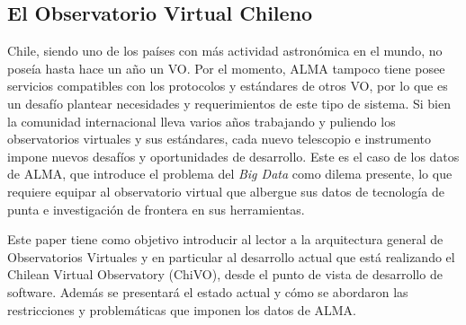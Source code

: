 \subsection{El Observatorio Virtual Chileno}
Chile, siendo uno de los países con más actividad astronómica en el mundo, no poseía hasta
hace un año un VO. Por el momento, ALMA tampoco tiene posee servicios
compatibles con los protocolos y estándares de otros VO, por lo que es un desafío
plantear necesidades y requerimientos de este tipo de sistema.
Si bien la comunidad internacional lleva varios años trabajando y puliendo
los observatorios virtuales y sus estándares, cada nuevo telescopio e
instrumento impone nuevos desafíos y oportunidades de desarrollo. 
Este es el caso de los datos de ALMA, que introduce el problema del
\emph{Big Data} como dilema presente, lo que requiere equipar al 
observatorio virtual que albergue sus datos de tecnología de punta 
e investigación de frontera en sus herramientas.

Este paper tiene como objetivo introducir al lector a la arquitectura general de
Observatorios Virtuales y en particular al desarrollo actual que está
realizando el Chilean Virtual Observatory (ChiVO), desde el punto de vista de
desarrollo de software. Además se presentará el estado actual y cómo se
abordaron las restricciones y problemáticas que imponen los datos de ALMA.

